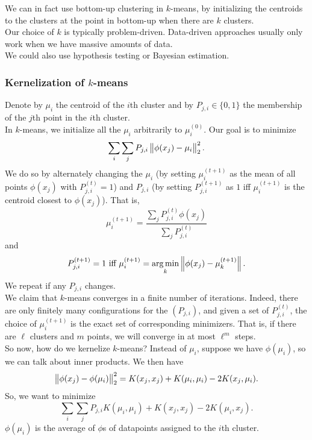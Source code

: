 \documentclass{article}
\begin{document}
			We can in fact use bottom-up clustering in $k$-means, by initializing the centroids to the clusters at the point in bottom-up when there are $k$ clusters.\\

			Our choice of $k$ is typically problem-driven. Data-driven approaches usually only work when we have massive amounts of data.\\
			We could also use hypothesis testing or Bayesian estimation.

		\subsubsection{Kernelization of \texorpdfstring{$k$}{k}-means}

			Denote by $\mu_i$ the centroid of the $i$th cluster and by $P_{j,i}\in\{0,1\}$ the membership of the $j$th point in the $i$th cluster.\\
			In $k$-means, we initialize all the $\mu_i$ arbitrarily to $\mu_i^{(0)}$. Our goal is to minimize
			\[ \sum_i \sum_j P_{j,i} \left\lVert\phi(x_j) - \mu_i\right\rVert_2^2. \]
			We do so by alternately changing the $\mu_i$ (by setting $\mu_i^{(t+1)}$ as the mean of all points $\phi(x_j)$ with $P_{j,i}^{(t)} = 1$) and $P_{j,i}$ (by setting $P_{j,i}^{(t+1)}$ as $1$ iff $\mu_i^{(t+1)}$ is the centroid closest to $\phi(x_j)$). That is,
			\[ \mu_i^{(t+1)} = \frac{\sum_{j} P_{j,i}^{(t)} \phi(x_j)}{\sum_j P_{j,i}^{(t)}} \]
			and
			\[ P_{j,i}^{(t+1)} = 1 \text{ iff } \mu_i^{(t+1)} = \operatorname*{arg\,min}_k \left\lVert\phi(x_j) - \mu_{k}^{(t+1)}\right\rVert. \]
			We repeat if any $P_{j,i}$ changes.\\

			We claim that $k$-means converges in a finite number of iterations. Indeed, there are only finitely many configurations for the $(P_{j,i})$, and given a set of $P_{j,i}^{(t)}$, the choice of $\mu_i^{(t+1)}$ is the exact set of corresponding minimizers. That is, if there are $\ell$ clusters and $m$ points, we will converge in at most $\ell^m$ steps.\\

			So now, how do we kernelize $k$-means? Instead of $\mu_i$, suppose we have $\phi(\mu_i)$, so we can talk about inner products. We then have
			\[ \left\lVert\phi(x_j) - \phi(\mu_i)\right\rVert_2^2 = K(x_j,x_j) + K(\mu_i,\mu_i)  - 2K(x_j,\mu_i). \]
			So, we want to minimize
			\[ \sum_i \sum_j P_{j,i} K(\mu_i,\mu_i) + K(x_j,x_j) - 2K(\mu_i,x_j). \]
			$\phi(\mu_i)$ is the average of $\phi$s of datapoints assigned to the $i$th cluster.

\end{document}

